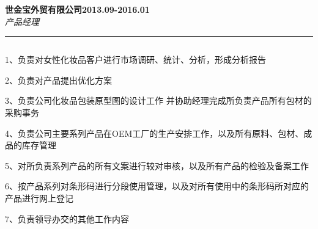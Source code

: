 \documentclass[11pt]{article} %
\begin{document}
\large{\textbf{世金宝外贸有限公司\hfill 2013.09-2016.01}}\\
\normalsize
\indent\textit{产品经理 \hfill  }
  \hrule\smallskip\vspace{-4mm}
 \begin{description}
  \setlength{\itemsep}{1pt}
  \setlength{\parskip}{0pt}
  \setlength{\parsep}{1pt}
  \item[工作描述:]$ $\\\vspace{-4mm}

1、负责对女性化妆品客户进行市场调研、统计、分析，形成分析报告

2、负责对产品提出优化方案

3、负责公司化妆品包装原型图的设计工作 并协助经理完成所负责产品所有包材的采购事务

4、负责公司主要系列产品在OEM工厂的生产安排工作，以及所有原料、包材、成品的库存管理

5、对所负责系列产品的所有文案进行较对审核，以及所有产品的检验及备案工作

6、按产品系列对条形码进行分段使用管理，以及对所有使用中的条形码所对应的产品进行网上登记

7、负责领导办交的其他工作内容


  \end{description}
  
\end{document}
